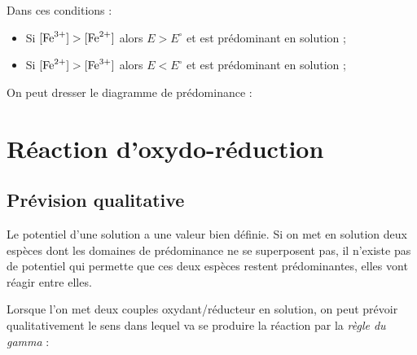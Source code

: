 \documentclass{cours}
\begin{document}
Dans ces conditions :
\begin{itemize}
  \item Si $[\ce{Fe^3+}]>[\ce{Fe^2+}]$ alors $E>E^\circ$ et  est prédominant en solution ;   
  \item Si $[\ce{Fe^2+}]>[\ce{Fe^3+}]$ alors $E<E^\circ$ et  est prédominant en solution ;   
\end{itemize}

On peut dresser le diagramme de prédominance :
\begin{center}
\end{center}




\section{Réaction d'oxydo-réduction}%
\label{sec:reaction_d_oxydo_reduction}

\subsection{Prévision qualitative}%
\label{sub:prevision_qualitative}
Le potentiel d'une solution a une valeur bien définie. Si on met en solution deux espèces dont les domaines de prédominance ne se superposent pas, il n'existe pas de potentiel qui permette que ces deux espèces restent prédominantes, elles vont réagir entre elles.

Lorsque l'on met deux couples oxydant/réducteur en solution, on peut prévoir qualitativement le sens dans lequel va se produire la réaction par la \emph{règle du gamma} :

\begin{center}
\end{center}
\end{document}
